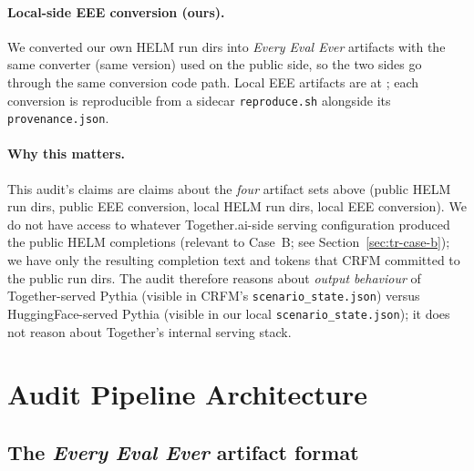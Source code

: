 \documentclass[11pt]{article}
\newcommand{\eee}{\textit{Every Eval Ever}\xspace}
\begin{document}
\paragraph{Local-side EEE conversion (ours).}
We converted our own HELM run dirs into \eee{} artifacts with the
  same  converter (same
  version) used on the public side, so the two sides go through the
  same conversion code path.
Local EEE artifacts are at
  ;
  each conversion is reproducible from a sidecar \texttt{reproduce.sh}
  alongside its \texttt{provenance.json}.

\paragraph{Why this matters.}
This audit's claims are claims about the \emph{four} artifact sets
  above (public HELM run dirs, public EEE conversion, local HELM run
  dirs, local EEE conversion).
We do not have access to whatever Together.ai-side serving
  configuration produced the public HELM completions
  (relevant to Case~B; see Section~\ref{sec:tr-case-b}); we have only
  the resulting completion text and tokens that CRFM committed to the
  public run dirs.
The audit therefore reasons about \emph{output behaviour} of
  Together-served Pythia (visible in CRFM's
  \texttt{scenario\_state.json}) versus HuggingFace-served Pythia
  (visible in our local \texttt{scenario\_state.json}); it does not
  reason about Together's internal serving stack.


\section{Audit Pipeline Architecture}
\label{sec:tr-pipeline}

\subsection{The \eee{} artifact format}
\label{sec:tr-eee-format}
\end{document}
